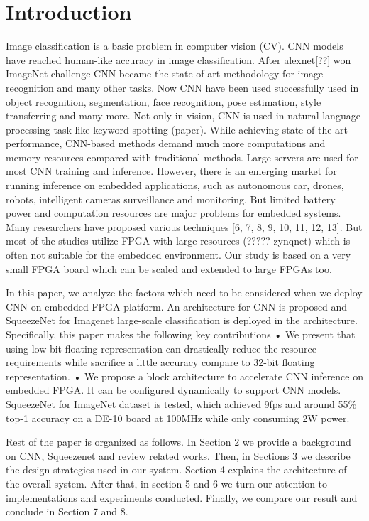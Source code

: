 \documentclass[conference]{IEEEtran}
\begin{document}
\section{Introduction}
Image classification is a basic problem in computer vision (CV). CNN models have reached human-like accuracy in image classification. After alexnet[??] won ImageNet challenge CNN became the state of art methodology for image recognition and many other tasks. Now CNN have been used successfully used in object recognition, segmentation, face recognition, pose estimation, style transferring and many more. Not only in vision, CNN is used in natural language processing task like keyword spotting (paper). While achieving state-of-the-art performance, CNN-based methods demand much more computations and memory resources compared with traditional methods. Large servers are used for most CNN training and inference. However, there is an emerging market for running inference on embedded applications, such as autonomous car, drones, robots, intelligent cameras surveillance and monitoring. But limited battery power and computation resources are major problems for embedded systems. Many researchers have proposed various techniques [6, 7, 8, 9, 10, 11, 12, 13]. But most of the studies utilize FPGA with large resources (????? zynqnet) which is often not suitable for the embedded environment. Our study is based on a very small FPGA board which can be scaled and extended to large FPGAs too.


In this paper, we analyze the factors which need to be considered when we deploy CNN on embedded FPGA platform. An architecture for CNN is proposed and SqueezeNet for Imagenet large-scale classification is deployed in the architecture. Specifically, this paper makes the following key contributions
• We present that using low bit floating representation can drastically reduce the resource requirements while sacrifice a little accuracy compare to 32-bit floating representation.
• We propose a block architecture to accelerate CNN inference on embedded FPGA. It can be configured dynamically to support CNN models. SqueezeNet for ImageNet dataset is tested, which achieved 9fps and around 55\% top-1 accuracy on a DE-10 board at 100MHz while only consuming 2W power.

Rest of the paper is organized as follows. In Section 2 we provide a background on CNN, Squeezenet and review related works. Then, in Sections 3 we describe the design strategies used in our system. Section 4 explains the architecture of the overall system. After that, in section 5 and 6 we turn our attention to implementations and experiments conducted.  Finally, we compare our result and conclude in Section 7 and 8.
\end{document}

